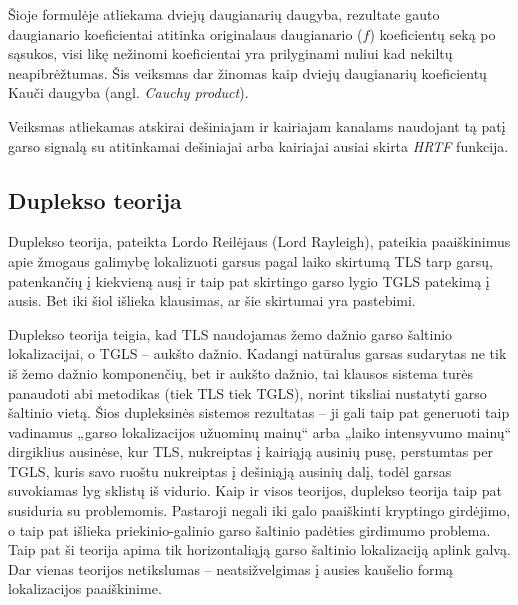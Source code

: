 \documentclass[]{vgtuef}
\begin{document}
Šioje formulėje atliekama dviejų daugianarių daugyba, rezultate gauto daugianario koeficientai atitinka originalaus daugianario ($f$) koeficientų seką po sąsukos, visi likę nežinomi koeficientai yra prilyginami nuliui kad nekiltų neapibrėžtumas. Šis veiksmas dar žinomas kaip dviejų daugianarių koeficientų Kauči daugyba (angl. \textit{Cauchy product}).

Veiksmas atliekamas atskirai dešiniajam ir kairiajam kanalams naudojant tą patį garso signalą su atitinkamai dešiniajai arba kairiajai ausiai skirta \textit{HRTF} funkcija.

\subsection{Duplekso teorija}

Duplekso teorija, pateikta Lordo Reilėjaus (Lord Rayleigh), pateikia paaiškinimus apie žmogaus galimybę lokalizuoti garsus pagal laiko skirtumą TLS tarp garsų, patenkančių į kiekvieną ausį ir taip pat skirtingo garso lygio TGLS patekimą į ausis. Bet iki šiol išlieka klausimas, ar šie skirtumai yra pastebimi.

Duplekso teorija teigia, kad TLS naudojamas žemo dažnio garso šaltinio lokalizacijai, o TGLS – aukšto dažnio. Kadangi natūralus garsas sudarytas ne tik iš žemo dažnio komponenčių, bet ir aukšto dažnio, tai klausos sistema turės panaudoti abi metodikas (tiek TLS tiek TGLS), norint tiksliai nustatyti garso šaltinio vietą. Šios dupleksinės sistemos rezultatas – ji gali taip pat generuoti taip vadinamus „garso lokalizacijos užuominų mainų“  arba „laiko intensyvumo mainų“ dirgiklius ausinėse, kur TLS, nukreiptas į kairiąją ausinių pusę, perstumtas per TGLS, kuris savo ruoštu nukreiptas į dešiniąją ausinių dalį, todėl garsas suvokiamas lyg sklistų iš vidurio. Kaip ir visos teorijos, duplekso teorija taip pat susiduria su problemomis. Pastaroji negali iki galo paaiškinti kryptingo girdėjimo, o taip pat išlieka priekinio-galinio garso šaltinio padėties girdimumo problema. Taip pat ši teorija apima tik horizontaliąją garso šaltinio lokalizaciją aplink galvą. Dar vienas teorijos netikslumas – neatsižvelgimas į ausies kaušelio formą lokalizacijos paaiškinime.
\end{document}
